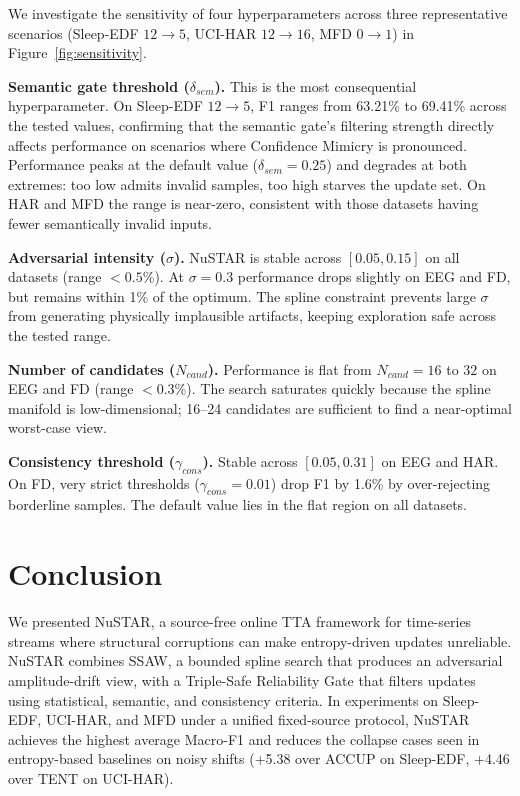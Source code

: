 \documentclass[sigconf, screen, review, anonymous]{acmart}
\theoremstyle{plain}
\theoremstyle{definition}
\theoremstyle{remark}
\begin{document}
We investigate the sensitivity of four hyperparameters across three
representative scenarios (Sleep-EDF $12{\to}5$, UCI-HAR $12{\to}16$,
MFD $0{\to}1$) in Figure~\ref{fig:sensitivity}.

\textbf{Semantic gate threshold ($\delta_{sem}$).}
This is the most consequential hyperparameter. On Sleep-EDF $12{\to}5$, F1 ranges from 63.21\% to 69.41\% across the tested values, confirming that the semantic gate's filtering strength directly affects performance on scenarios where Confidence Mimicry is pronounced. Performance peaks at the default value ($\delta_{sem}=0.25$) and degrades at both extremes: too low admits invalid samples, too high starves the update set. On HAR and MFD the range is near-zero, consistent with those datasets
having fewer semantically invalid inputs.

\textbf{Adversarial intensity ($\sigma$).}
NuSTAR is stable across $[0.05, 0.15]$ on all datasets (range $<0.5$\%). At $\sigma=0.3$ performance drops slightly on EEG and FD, but remains within 1\% of the optimum. The spline constraint prevents large $\sigma$ from generating physically implausible artifacts, keeping exploration safe across the tested range.

\textbf{Number of candidates ($N_{cand}$).}
Performance is flat from $N_{cand}=16$ to $32$ on EEG and FD (range $<0.3$\%). The search saturates quickly because the spline manifold is low-dimensional; 16--24 candidates are sufficient to find a near-optimal worst-case view.

\textbf{Consistency threshold ($\gamma_{cons}$).}
Stable across $[0.05, 0.31]$ on EEG and HAR. On FD, very strict thresholds ($\gamma_{cons}=0.01$) drop F1 by 1.6\% by over-rejecting borderline samples. The default value lies in the flat region on all datasets.

	\section{Conclusion}
	We presented NuSTAR, a source-free online TTA framework for time-series streams where structural corruptions can make entropy-driven updates unreliable. NuSTAR combines SSAW, a bounded spline search that produces an adversarial amplitude-drift view, with a Triple-Safe Reliability Gate that filters updates using statistical, semantic, and consistency criteria. In experiments on Sleep-EDF, UCI-HAR, and MFD under a unified fixed-source protocol, NuSTAR achieves the highest average Macro-F1 and reduces the collapse cases seen in entropy-based baselines on noisy shifts (+5.38 over ACCUP on Sleep-EDF, +4.46 over TENT on UCI-HAR).
\end{document}
